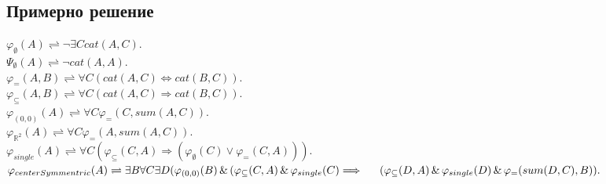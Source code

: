 \documentclass[12pt]{article}
\begin{document}
\subsection{Примерно решение}
\begin{addmargin}[1em]{2em}
$\varphi_{\emptyset}(A) \rightleftharpoons \neg \exists C cat(A,C).$\\
$\varPsi_{\emptyset}(A) \rightleftharpoons \neg cat(A,A).$\\
$\varphi_{=}(A, B) \rightleftharpoons \forall C (cat(A,C) \iff cat(B,C)).$\\
$\varphi_{\subseteq}(A, B) \rightleftharpoons \forall C (cat(A,C) \Longrightarrow cat(B,C)).$\\
$\varphi_{(0,0)}(A) \rightleftharpoons \forall C \varphi_{=}(C, sum(A,C)).$\\
$\varphi_{\mathbb{R}^2}(A) \rightleftharpoons \forall C \varphi_{=}(A, sum(A,C)).$\\
$\varphi_{single}(A) \rightleftharpoons \forall C (\varphi_{\subseteq}(C, A) \Longrightarrow (\varphi_{\emptyset}(C) \lor \varphi_{=}(C, A))).$\\
$\varphi_{centerSymmentric}(A) \rightleftharpoons \exists B\forall C \exists D(\varphi_{(0,0)}(B)\,\&\,(\varphi_{\subseteq}(C, A)\,\&\,\varphi_{single}(C) \Longrightarrow \indent (\varphi_{\subseteq}(D, A)\,\&\,\varphi_{single}(D)\,\&\,\varphi_{=}(sum(D,C),B) ).$\\ 



\end{addmargin}
\end{document}
